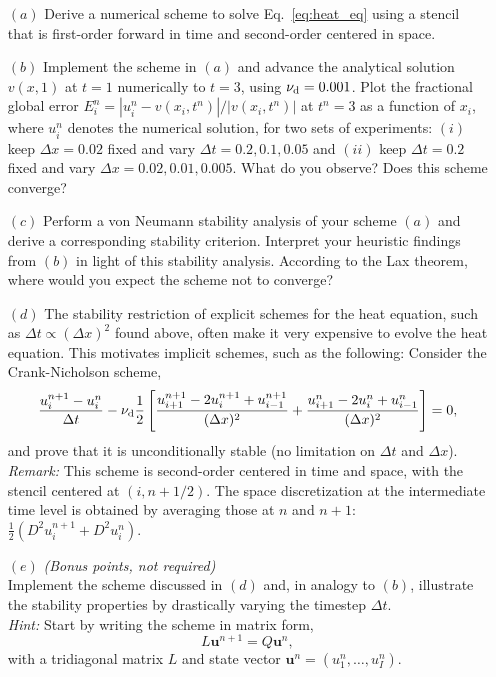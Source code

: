 \documentclass[letter,11pt]{article}
\begin{document}
\begin{itemize}
  	\item[$(a)$] Derive a numerical scheme to solve Eq.~\eqref{eq:heat_eq} using a stencil that is first-order forward in time and second-order centered in space.

  	\item[$(b)$] Implement the scheme in $(a)$ and advance the analytical solution $v(x,1)$ at $t=1$ numerically to $t=3$, using $\nu_{\rm d}=0.001$. Plot the fractional global error $E^n_i=|u^n_i-v(x_i,t^n)|/|v(x_i,t^n)|$ at $t^n = 3$ as a function of $x_i$, where $u^n_i$ denotes the numerical solution, for two sets of experiments: $(i)$ keep $\Delta x = 0.02$ fixed and vary $\Delta t = 0.2,0.1,0.05$ and $(ii)$ keep $\Delta t = 0.2$ fixed and vary $\Delta x = 0.02,0.01,0.005$. What do you observe? Does this scheme converge?

  	\item[$(c)$] Perform a von Neumann stability analysis of your scheme $(a)$ and derive a corresponding stability criterion. Interpret your heuristic findings from $(b)$ in light of this stability analysis. According to the Lax theorem, where would you expect the scheme not to converge?

  	\item[$(d)$] The stability restriction of explicit schemes for the heat equation, such as $\Delta t \propto (\Delta x)^2$ found above, often make it very expensive to evolve the heat equation. This motivates implicit schemes, such as the following: Consider the Crank-Nicholson scheme,
  	\begin{equation}
  		\frac{u_i^{n+1} - u_i^{n}}{\Delta t} - \nu_{\rm d} \frac{1}{2}\left[\frac{u_{i+1}^{n+1} - 2u^{n+1}_{i} + u_{i-1}^{n+1}}{(\Delta x)^2} + \frac{u_{i+1}^{n} - 2u^{n}_{i} + u_{i-1}^{n}}{(\Delta x)^2}  \right]   = 0,
  	\end{equation}
  	and prove that it is unconditionally stable (no limitation on $\Delta t$ and $\Delta x$).\\ \emph{Remark:} This scheme is second-order centered in time and space, with the stencil centered at $(i, n+1/2)$. The space discretization at the intermediate time level is obtained by averaging those at $n$ and $n+1$: $\frac{1}{2}(D^2u_i^{n+1} + D^2 u_i^{n})$.

  	\item[$(e)$] \emph{(Bonus points, not required)}\\
  	Implement the scheme discussed in $(d)$ and, in analogy to $(b)$, illustrate the stability properties by drastically varying the timestep $\Delta t$.\\
  	\emph{Hint:} Start by writing the scheme in matrix form,
  	\begin{equation}
  		L \mathbf{u}^{n+1} = Q\mathbf{u}^{n},
  	\end{equation}
  	with a tridiagonal matrix $L$ and state vector $\mathbf{u}^{n}=(u_1^n,\ldots,u_I^n)$.

\end{itemize}
\end{document}
